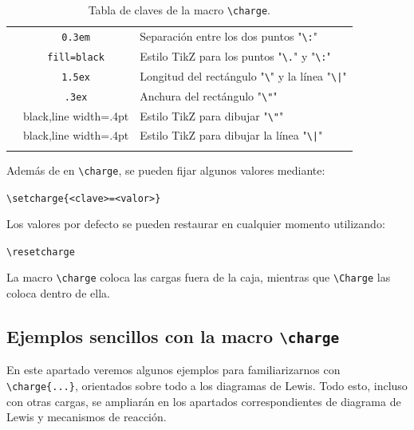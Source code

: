 {\begin{center}
\begin{longtable}{rcl}
    & \texttt{0.3em}
    & Separación entre los dos puntos "\texttt{\textbackslash:}"\\
    \texttt{\color{Blue}{.style}}
    & \texttt{fill=black}
    & Estilo \textsf{TikZ} para los puntos "\texttt{\textbackslash.}" y
      "\texttt{\textbackslash:}"\\
    \texttt{\color{Blue}{"length}}
    & \texttt{1.5ex}
    & Longitud del rectángulo "\texttt{\textbackslash}" y la línea
      "\texttt{\textbackslash|}"\\
    \texttt{\color{Blue}{"width}}
    & \texttt{.3ex}
    & Anchura del rectángulo "\texttt{\textbackslash"}"\\
    \texttt{\color{Blue}{"style}}
    & {\scriptsize black,line width=.4pt}
    & Estilo \textsf{TikZ} para dibujar "\texttt{\textbackslash"}"\\
    \texttt{\color{Blue}{|style}}
    & {\scriptsize black,line width=.4pt}
    & Estilo \textsf{TikZ} para dibujar la línea "\texttt{\textbackslash|}"\\
    \hline
    \caption{Tabla de claves de la macro \texttt{\backslash charge}.}
  \end{longtable}
\end{center}
}

\vspace{-5ex}
Además de en \texttt{\textbackslash charge}, se pueden fijar algunos valores mediante:
\begin{center}
  \texttt{\textbackslash setcharge\{<clave>=<valor>\}}
\end{center}

Los valores por defecto se pueden restaurar en cualquier momento utilizando:
\begin{center}
  \texttt{\textbackslash resetcharge}
\end{center}

La macro \texttt{\textbackslash charge} coloca las cargas fuera de la caja, mientras
que \texttt{\textbackslash Charge} las coloca dentro de ella.


\subsection{Ejemplos sencillos con la macro \texttt{\textbackslash charge}}
En este apartado veremos algunos ejemplos para familiarizarnos con
\texttt{\textbackslash charge\{...\}}, orientados sobre todo a los diagramas de Lewis.
Todo esto, incluso con otras cargas, se ampliarán en los apartados correspondientes
de diagrama de Lewis y mecanismos de reacción.

